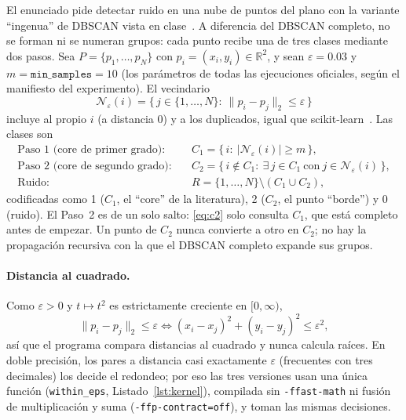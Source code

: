 \documentclass[11pt,letterpaper]{article}
\newcommand{\code}[1]{\texttt{#1}}
\begin{document}
El enunciado pide detectar ruido en una nube de puntos del plano con la variante ``ingenua'' de DBSCAN vista en
clase~\cite{enunciado,ester1996}. A diferencia del DBSCAN completo, no se forman ni se numeran grupos: cada punto
recibe una de tres clases mediante dos pasos. Sea $P=\{p_1,\dots,p_N\}$ con $p_i=(x_i,y_i)\in\mathbb{R}^2$, y sean
$\varepsilon=0.03$ y $m=\code{min\_samples}=10$ (los parámetros de todas las ejecuciones oficiales, según el
manifiesto del experimento). El vecindario
\begin{equation}\label{eq:vecindario}
  \mathcal N_\varepsilon(i)=\bigl\{\,j\in\{1,\dots,N\}:\ \lVert p_i-p_j\rVert_2\le\varepsilon\,\bigr\}
\end{equation}
incluye al propio $i$ (a distancia 0) y a los duplicados, igual que scikit-learn~\cite{sklearn}. Las clases son
\begin{align}
  \text{Paso 1 (core de primer grado):}\quad & C_1=\bigl\{\,i:\ |\mathcal N_\varepsilon(i)|\ge m\,\bigr\},
    \label{eq:c1}\\
  \text{Paso 2 (core de segundo grado):}\quad & C_2=\bigl\{\,i\notin C_1:\ \exists\, j\in C_1\ \text{con}\
    j\in\mathcal N_\varepsilon(i)\,\bigr\}, \label{eq:c2}\\
  \text{Ruido:}\quad & R=\{1,\dots,N\}\setminus(C_1\cup C_2), \label{eq:ruido}
\end{align}
codificadas como 1 ($C_1$, el ``core'' de la literatura), 2 ($C_2$, el punto ``borde'') y 0 (ruido). El Paso~2 es de
un solo salto: \eqref{eq:c2} solo consulta $C_1$, que está completo antes de empezar. Un punto de $C_2$ nunca
convierte a otro en $C_2$; no hay la propagación recursiva con la que el DBSCAN completo expande sus grupos.

\paragraph{Distancia al cuadrado.} Como $\varepsilon>0$ y $t\mapsto t^2$ es estrictamente creciente en
$[0,\infty)$,
\begin{equation}\label{eq:cuadrado}
  \lVert p_i-p_j\rVert_2\le\varepsilon \iff (x_i-x_j)^2+(y_i-y_j)^2\le\varepsilon^2 ,
\end{equation}
así que el programa compara distancias al cuadrado y nunca calcula raíces. En doble precisión, los pares a distancia
casi exactamente $\varepsilon$ (frecuentes con tres decimales) los decide el redondeo; por eso las tres versiones usan
una única función (\code{within\_eps}, Listado~\ref{lst:kernel}), compilada sin \code{-ffast-math} ni fusión de
multiplicación y suma (\code{-ffp-contract=off}), y toman las mismas decisiones.
\end{document}
